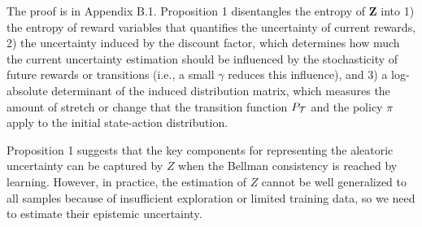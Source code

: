 \documentclass{article}
\newcommand{\horizon}{T_{H}}
\newcommand{\state}{s}
\newcommand{\action}{a}
\newcommand{\transition}{t}
\newcommand{\reward}{r}
\newcommand{\dataset}{\mathcal{D}}
\newcommand{\expect}{\mathbb{E}}
\newtheorem{proposition}{Proposition}
\DeclareMathOperator*{\argmax}{argmax}
\begin{document}
The proof is in Appendix B.1. Proposition 1 disentangles the entropy of $\boldsymbol{Z}$ into 1) the entropy of reward variables that quantifies the uncertainty of current rewards, 2) the uncertainty induced by the discount factor, which determines how much the current uncertainty estimation should be influenced by the stochasticity of future rewards or transitions (i.e., a small $\gamma$ reduces this influence), and 3) a log-absolute determinant of the induced distribution matrix, which measures the amount of stretch or change that the transition function $P_{\mathcal{\MakeUppercase{\transition}}}$ and the policy $\pi$ apply to the initial state-action distribution.

Proposition 1 suggests that the key components for representing the aleatoric uncertainty can be captured by $Z$ when the Bellman consistency is reached by learning.  However, in practice,  the estimation of $Z$ cannot be well generalized to all samples because of insufficient exploration or limited training data, so we need to estimate their epistemic uncertainty. 


\end{document}

